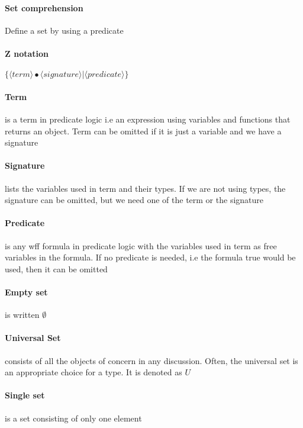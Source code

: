 \documentclass[12pt]{report}
\begin{document}
    \paragraph{Set comprehension} Define a set by using a predicate

    \paragraph{Z notation} $ \{ \langle term \rangle \bullet \langle signature
    \rangle | \langle predicate \rangle \} $

    \paragraph{Term} is a term in predicate logic i.e an expression using
    variables and functions that returns an object. Term can be omitted if it
    is just a variable and we have a signature

    \paragraph{Signature} lists the variables used in term and their types. If
    we are not using types, the signature can be omitted, but we need one of
    the term or the signature

    \paragraph{Predicate} is any wff formula in predicate logic with the
    variables used in term as free variables in the formula. If no predicate is
    needed, i.e the formula true would be used, then it can be omitted

    \paragraph{Empty set} is written $\emptyset$

    \paragraph{Universal Set} consists of all the objects of concern in any
    discussion. Often, the universal set is an appropriate choice for a type.
    It is denoted as $U$

    \paragraph{Single set} is a set consisting of only one element
\end{document}
